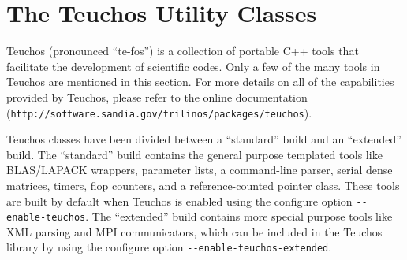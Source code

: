 % 
% 
% 
%   
%   
% 
% 

\section{The Teuchos Utility Classes}
\label{chap:teuchos}

Teuchos (pronounced ``te-fos'') is a collection of portable C++ tools
that facilitate the development of scientific codes.  Only a few of the many
tools in Teuchos are mentioned in this section.
For more details on all of the capabilities provided by Teuchos, please 
refer to the online documentation (\verb!http://software.sandia.gov/trilinos/packages/teuchos!).

Teuchos classes have been divided between a ``standard'' build and an
``extended'' build. The ``standard'' build contains the general purpose
templated tools like BLAS/LAPACK wrappers, parameter lists, a command-line parser,
serial dense matrices, timers, flop counters, and a reference-counted pointer class.  
These tools are built by default when Teuchos is enabled using the 
configure option \verb!--enable-teuchos!. 
The ``extended'' build contains more special purpose tools like 
XML parsing and MPI communicators, which can be included in the Teuchos
library by using the configure option \verb!--enable-teuchos-extended!.

\medskip

